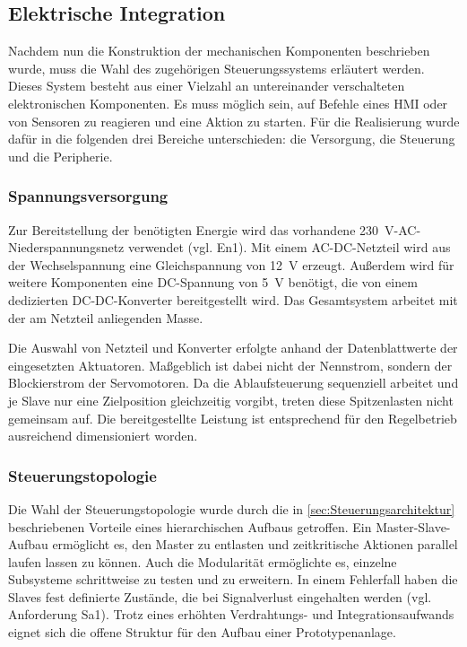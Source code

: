 \subsection{Elektrische Integration}\label{sec:ElektrischeIntegration}
Nachdem nun die Konstruktion der mechanischen Komponenten beschrieben wurde, muss die Wahl des zugehörigen Steuerungssystems erläutert
werden. Dieses System besteht aus einer Vielzahl an untereinander verschalteten elektronischen Komponenten. Es muss möglich sein, auf
Befehle eines HMI oder von Sensoren zu reagieren und eine Aktion zu starten. Für die Realisierung wurde dafür
in die folgenden drei Bereiche unterschieden: die Versorgung, die Steuerung und die Peripherie.

\subsubsection{Spannungsversorgung}\label{sec:SpannungsVersorgung}
Zur Bereitstellung der benötigten Energie wird das vorhandene \qty{230}{\volt}-AC-Niederspannungsnetz verwendet (vgl. En1). Mit einem
AC-DC-Netzteil wird aus der Wechselspannung eine Gleichspannung von \qty{12}{\volt} erzeugt. Außerdem wird für weitere Komponenten eine DC-Spannung von \qty{5}{\volt} benötigt,
die von einem dedizierten DC-DC-Konverter bereitgestellt wird. Das Gesamtsystem arbeitet mit
der am Netzteil anliegenden Masse. 

Die Auswahl von Netzteil und Konverter erfolgte anhand der Datenblattwerte der
eingesetzten Aktuatoren. Maßgeblich ist dabei nicht der Nennstrom, sondern der
Blockierstrom der Servomotoren. Da die Ablaufsteuerung sequenziell arbeitet und je
Slave nur eine Zielposition gleichzeitig vorgibt,
treten diese Spitzenlasten nicht gemeinsam auf. Die bereitgestellte Leistung ist entsprechend
für den Regelbetrieb ausreichend dimensioniert worden.

\subsubsection{Steuerungstopologie}\label{sec:Microcontroller}
Die Wahl der Steuerungstopologie wurde durch die in \cref{sec:Steuerungsarchitektur} beschriebenen Vorteile eines hierarchischen
Aufbaus getroffen. Ein Master-Slave-Aufbau ermöglicht es, den Master zu entlasten und zeitkritische Aktionen parallel laufen
lassen zu können. Auch die Modularität ermöglichte es, einzelne Subsysteme schrittweise zu testen und zu erweitern. In einem
Fehlerfall haben die Slaves fest definierte Zustände, die bei Signalverlust eingehalten werden (vgl. Anforderung Sa1).
Trotz eines erhöhten Verdrahtungs- und Integrationsaufwands eignet sich die offene Struktur für den Aufbau einer Prototypenanlage.


